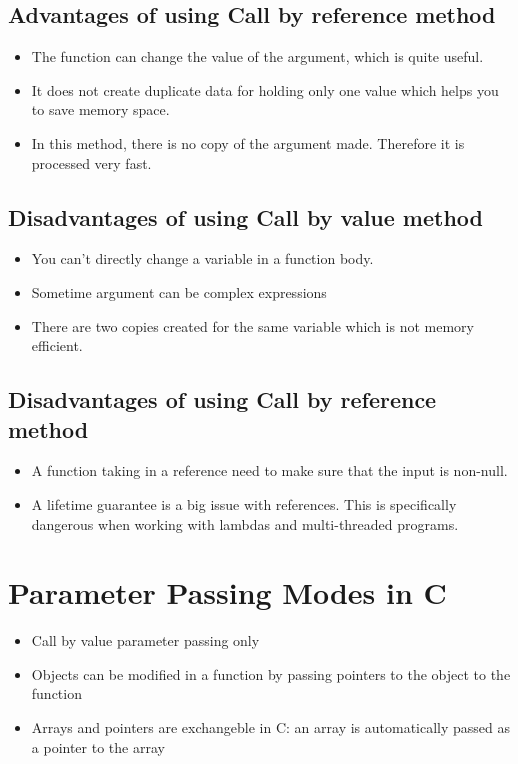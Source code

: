 \documentclass[12pt]{article}
\begin{document}
\subsection{Advantages of using Call by reference method}

\begin{itemize}
	\item The function can change the value of the argument, which is quite useful.
	\item It does not create duplicate data for holding only one value which helps you to save memory space.
	\item In this method, there is no copy of the argument made. Therefore it is processed very fast.
\end{itemize}


\subsection{Disadvantages of using Call by value method}

\begin{itemize}
	\item You can't directly change a variable in a function body.
	\item Sometime argument can be complex expressions
	\item There are two copies created for the same variable which is not memory efficient.
\end{itemize}


\subsection{Disadvantages of using Call by reference method}

\begin{itemize}
	\item A function taking in a reference need to make sure that the input is non-null. 
	\item A lifetime guarantee is a big issue with references. This is specifically dangerous when working with lambdas and multi-threaded programs.
\end{itemize}

\section{Parameter Passing Modes in C}

\begin{itemize}
	\item Call by value parameter passing only
	\item Objects can be modified in a function by passing pointers to the object to the function
	\item Arrays and pointers are exchangeble in C: an array is
automatically passed as a pointer to the array
\end{itemize}
\end{document}
